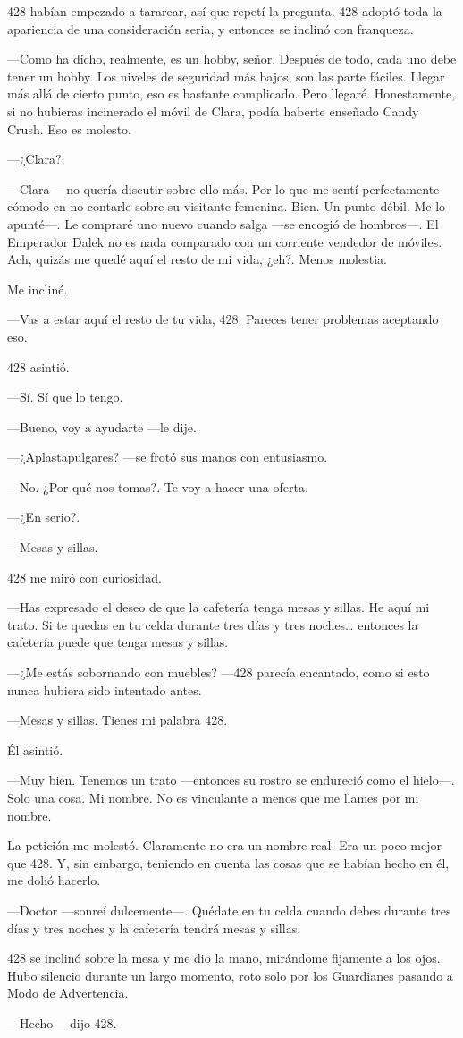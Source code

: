 428 habían empezado a tararear, así que repetí la pregunta. 428 adoptó
toda la apariencia de una consideración seria, y entonces se inclinó con
franqueza.

---Como ha dicho, realmente, es un hobby, señor. Después de todo, cada
uno debe tener un hobby. Los niveles de seguridad más bajos, son las
parte fáciles. Llegar más allá de cierto punto, eso es bastante
complicado. Pero llegaré. Honestamente, si no hubieras incinerado el
móvil de Clara, podía haberte enseñado Candy Crush. Eso es molesto.

---¿Clara?.

---Clara ---no quería discutir sobre ello más. Por lo que me sentí
perfectamente cómodo en no contarle sobre su visitante femenina. Bien.
Un punto débil. Me lo apunté---. Le compraré uno nuevo cuando salga
---se encogió de hombros---. El Emperador Dalek no es nada comparado con
un corriente vendedor de móviles. Ach, quizás me quedé aquí el resto de
mi vida, ¿eh?. Menos molestia.

Me incliné.

---Vas a estar aquí el resto de tu vida, 428. Pareces tener problemas
aceptando eso.

428 asintió.

---Sí. Sí que lo tengo.

---Bueno, voy a ayudarte ---le dije.

---¿Aplastapulgares? ---se frotó sus manos con entusiasmo.

---No. ¿Por qué nos tomas?. Te voy a hacer una oferta.

---¿En serio?.

---Mesas y sillas.

428 me miró con curiosidad.

---Has expresado el deseo de que la cafetería tenga mesas y sillas. He
aquí mi trato. Si te quedas en tu celda durante tres días y tres
noches\ldots{} entonces la cafetería puede que tenga mesas y sillas.

---¿Me estás sobornando con muebles? ---428 parecía encantado, como si
esto nunca hubiera sido intentado antes.

---Mesas y sillas. Tienes mi palabra 428.

Él asintió.

---Muy bien. Tenemos un trato ---entonces su rostro se endureció como el
hielo---. Solo una cosa. Mi nombre. No es vinculante a menos que me
llames por mi nombre.

La petición me molestó. Claramente no era un nombre real. Era un poco
mejor que 428. Y, sin embargo, teniendo en cuenta las cosas que se
habían hecho en él, me dolió hacerlo.

---Doctor ---sonreí dulcemente---. Quédate en tu celda cuando debes
durante tres días y tres noches y la cafetería tendrá mesas y sillas.

428 se inclinó sobre la mesa y me dio la mano, mirándome fijamente a los
ojos. Hubo silencio durante un largo momento, roto solo por los
Guardianes pasando a Modo de Advertencia.

---Hecho ---dijo 428.
